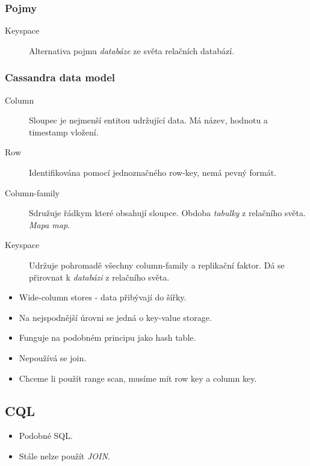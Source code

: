 \documentclass{article}
\begin{document}
    \subsubsection{Pojmy}
      \begin{description}
        \item[Keyspace] Alternativa pojmu \emph{databáze} ze světa relačních databází.
      \end{description}

    \subsubsection{Cassandra data model}
      \begin{description}
        \item[Column] Sloupec je nejmenší entitou udržující data. Má název, hodnotu a timestamp vložení.
        \item[Row] Identifikována pomocí jednoznačného row-key, nemá pevný formát.
        \item[Column-family] Sdružuje řádkym které obsahují sloupce. Obdoba \emph{tabulky} z relačního světa. \emph{Mapa map}.
        \item[Keyspace] Udržuje pohromadě všechny column-family a replikační faktor. Dá se přirovnat k \emph{databázi} z relačního světa.
      \end{description}

      \begin{itemize}
        \item Wide-column stores - data přibývají do šířky.
        \item Na nejspodnější úrovni se jedná o key-value storage.
        \item Funguje na podobném principu jako hash table.
        \item Nepoužívá se join.
        \item Chceme li použít range scan, musíme mít row key a column key.
      \end{itemize}

    \subsection{CQL}
      \begin{itemize}
        \item Podobné SQL.
        \item Stále nelze použít \emph{JOIN}.
      \end{itemize}
\end{document}
